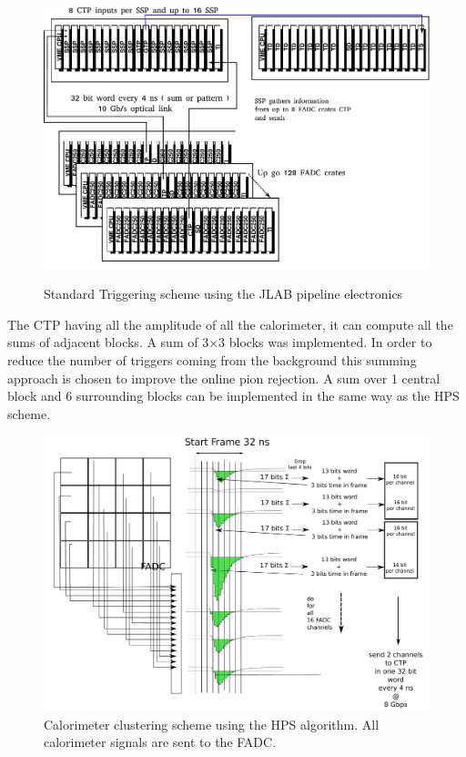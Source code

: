\documentclass{article}
\begin{document}
\begin{figure}
  \centering
\includegraphics[width=\textwidth]{figs/TriggerPipeline.pdf}\\
  \caption{Standard Triggering scheme using the JLAB pipeline electronics}\label{fig:pipeline_daq}
\end{figure}

The CTP having all the amplitude of all the calorimeter, it can compute all the sums of adjacent blocks.
A sum of 3$\times$3 blocks was implemented.
In order to reduce the number of triggers coming from the background this summing approach is chosen to improve the online pion rejection.
A sum over 1 central block and 6 surrounding blocks can be implemented in the same way as the HPS scheme.

\begin{figure}
  \centering
 \includegraphics[width=\textwidth]{figs/CaloTrigger.pdf}
  \caption{Calorimeter clustering scheme using the HPS algorithm. All calorimeter signals are sent to the FADC. }\label{fig:ClustHPS}
\end{figure}
\end{document}
